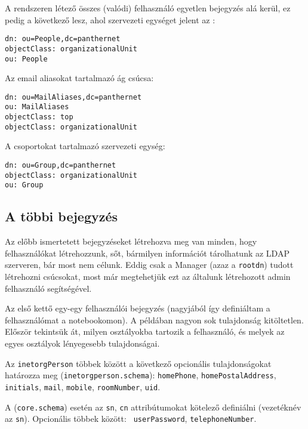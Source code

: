 \noindent A rendszeren létező összes (valódi) felhasználó egyetlen bejegyzés alá kerül, ez pedig a következő lesz, ahol
szervezeti egységet jelent az :

\begin{Verbatim}[frame=single]
dn: ou=People,dc=panthernet
objectClass: organizationalUnit
ou: People  
\end{Verbatim}


\noindent Az email aliasokat tartalmazó ág csúcsa:

\begin{Verbatim}[frame=single]
dn: ou=MailAliases,dc=panthernet
ou: MailAliases
objectClass: top
objectClass: organizationalUnit
\end{Verbatim}


\noindent A csoportokat tartalmazó szervezeti egység:

\begin{Verbatim}[frame=single]
dn: ou=Group,dc=panthernet
objectClass: organizationalUnit
ou: Group
\end{Verbatim}



\subsection{A többi bejegyzés}
Az előbb ismertetett bejegyzéseket létrehozva meg van minden, hogy felhasználókat létrehozzunk, sőt, bármilyen
információt tárolhatunk az LDAP szerveren, bár most nem célunk. Eddig csak a Manager (azaz a \texttt{rootdn}) tudott
létrehozni csúcsokat, most már megtehetjük ezt az általunk létrehozott admin felhasználó segítségével.


Az első kettő egy-egy felhasználói bejegyzés (nagyjából így definiáltam a felhasználómat a notebookomon).
A példában nagyon sok tulajdonság kitöltetlen. Először tekintsük át, milyen osztályokba tartozik a felhasználó, és
melyek az egyes osztályok lényegesebb tulajdonságai.

Az \texttt{inetorgPerson} többek között a következő opcionális tulajdonságokat határozza meg
(\texttt{inetorgperson.schema}):
\texttt{homePhone}, \texttt{homePostalAddress}, \texttt{initials}, \texttt{mail},  \texttt{mobile},
\texttt{roomNumber}, \texttt{uid}.

A  (\texttt{core.schema}) esetén az \texttt{sn}, \texttt{cn} attribútumokat kötelező definiálni
(vezetéknév az \texttt{sn}). Opcionális többek között: \texttt{ userPassword}, \texttt{telephoneNumber}.

